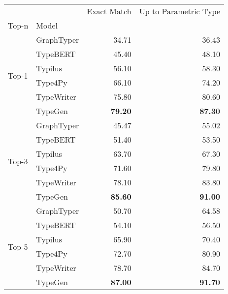 \begin{tabular}{llrr}
\toprule
 &  & Exact Match & Up to Parametric Type \\
Top-n & Model &  &  \\
\midrule
\multirow[c]{6}{*}{Top-1} & GraphTyper & 34.71 & 36.43 \\
 & TypeBERT & 45.40 & 48.10 \\
 & Typilus & 56.10 & 58.30 \\
 & Type4Py & 66.10 & 74.20 \\
 & TypeWriter & 75.80 & 80.60 \\
 & TypeGen & \bfseries 79.20 & \bfseries 87.30 \\
\cline{1-4}
\multirow[c]{6}{*}{Top-3} & GraphTyper & 45.47 & 55.02 \\
 & TypeBERT & 51.40 & 53.50 \\
 & Typilus & 63.70 & 67.30 \\
 & Type4Py & 71.60 & 79.80 \\
 & TypeWriter & 78.10 & 83.80 \\
 & TypeGen & \bfseries 85.60 & \bfseries 91.00 \\
\cline{1-4}
\multirow[c]{6}{*}{Top-5} & GraphTyper & 50.70 & 64.58 \\
 & TypeBERT & 54.10 & 56.50 \\
 & Typilus & 65.90 & 70.40 \\
 & Type4Py & 72.70 & 80.90 \\
 & TypeWriter & 78.70 & 84.70 \\
 & TypeGen & \bfseries 87.00 & \bfseries 91.70 \\
\cline{1-4}
\bottomrule
\end{tabular}

